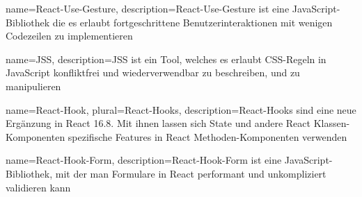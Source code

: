 {   name={React-Use-Gesture},
    description={React-Use-Gesture ist eine JavaScript-Bibliothek die es erlaubt fortgeschrittene Benutzerinteraktionen mit wenigen Codezeilen zu implementieren}
}

{   name={JSS},
    description={JSS ist ein Tool, welches es erlaubt CSS-Regeln in JavaScript konfliktfrei und wiederverwendbar zu beschreiben, und zu manipulieren}
}

{   name={React-Hook},
    plural={React-Hooks},
    description={React-Hooks sind eine neue Ergänzung in React 16.8. Mit ihnen lassen sich State und andere React Klassen-Komponenten spezifische Features in React Methoden-Komponenten verwenden}
}

{   name={React-Hook-Form},
    description={React-Hook-Form ist eine JavaScript-Bibliothek, mit der man Formulare in React performant und unkompliziert validieren kann}
}
